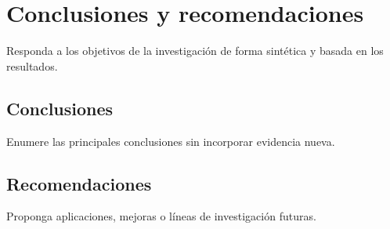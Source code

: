\chapter{Conclusiones y recomendaciones}
\label{cap:conclusiones}

Responda a los objetivos de la investigación de forma sintética y basada en
los resultados.

\section{Conclusiones}

Enumere las principales conclusiones sin incorporar evidencia nueva.

\section{Recomendaciones}

Proponga aplicaciones, mejoras o líneas de investigación futuras.
